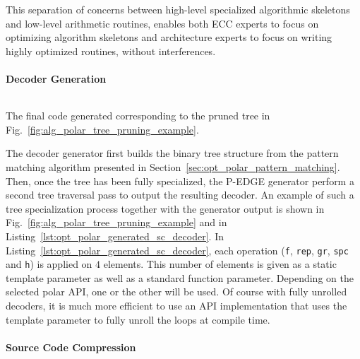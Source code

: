 This separation of concerns between high-level specialized algorithmic skeletons
and low-level arithmetic routines, enables both ECC experts to focus on
optimizing algorithm skeletons and architecture experts to focus on writing
highly optimized routines, without interferences.

\paragraph{Decoder Generation}

\begin{listing}[htp]
  \inputminted[frame=lines,linenos]{C++}{main/chapter3/src/polar/generated_sc_decoder.cpp}
  \caption{The final code generated corresponding to the pruned tree in
    Fig.~\ref{fig:alg_polar_tree_pruning_example}.}
  \label{lst:opt_polar_generated_sc_decoder}
\end{listing}

The decoder generator first builds the binary tree structure from the pattern
matching algorithm presented in Section~\ref{sec:opt_polar_pattern_matching}.
Then, once the tree has been fully specialized, the P-EDGE generator perform a
second tree traversal pass to output the resulting decoder. An example of such a
tree specialization process together with the generator output is shown in
Fig.~\ref{fig:alg_polar_tree_pruning_example} and in
Listing~\ref{lst:opt_polar_generated_sc_decoder}. In
Listing~\ref{lst:opt_polar_generated_sc_decoder}, each operation (\verb|f|,
\verb|rep|, \verb|gr|, \verb|spc| and \verb|h|) is applied on $4$ elements. This
number of elements is given as a static template parameter as well as a standard
function parameter. Depending on the selected polar API, one or the other will
be used. Of course with fully unrolled decoders, it is much more efficient to
use an API implementation that uses the template parameter to fully unroll the
loops at compile time.

\paragraph{Source Code Compression}


